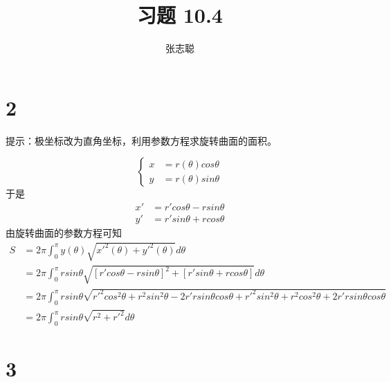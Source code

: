 \documentclass{article}
\begin{document}
\title{习题 10.4}
\author{张志聪}
\maketitle

\section*{2}

提示：极坐标改为直角坐标，利用参数方程求旋转曲面的面积。

\begin{equation*}
  \begin{cases}
    x & = r(\theta) cos \theta \\
    y & = r(\theta) sin \theta
  \end{cases}
\end{equation*}
于是
\begin{align*}
  x' & = r'cos \theta - r sin \theta \\
  y' & = r'sin \theta + r cos \theta
\end{align*}
由旋转曲面的参数方程可知
\begin{align*}
  S & = 2\pi \int_{0}^{\pi} y(\theta) \sqrt{x'^2(\theta) + y'^2(\theta)} d\theta                                                                                                      \\
    & = 2\pi \int_{0}^{\pi} r sin \theta \sqrt{[r' cos \theta - r sin \theta]^2 + [r' sin \theta + r cos \theta]} d\theta                                                             \\
    & = 2\pi \int_{0}^{\pi} r sin \theta \sqrt{r'^2 cos^2 \theta + r^2 sin^2 \theta - 2 r'r sin\theta cos \theta + r'^2 sin^2 \theta + r^2 cos^2 \theta + 2 r'r sin\theta cos \theta} \\
    & = 2\pi \int_{0}^{\pi} r sin \theta \sqrt{r^2 + r'^2} d \theta
\end{align*}

\section*{3}
\end{document}
